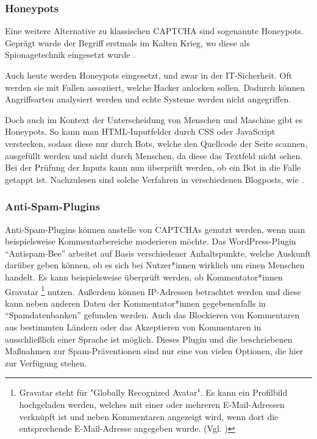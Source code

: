 \subsubsection*{Honeypots}
Eine weitere Alternative zu klassischen CAPTCHA sind sogenannte Honeypots. 
Geprägt wurde der Begriff erstmals im Kalten Krieg, wo diese als Spionagetechnik eingesetzt wurde \cite[p.2]{joshi:2011}.  

Auch heute werden Honeypots eingesetzt, und zwar in der IT-Sicherheit. 
Oft werden sie mit Fallen assoziiert, welche Hacker anlocken sollen. 
Dadurch können Angriffsarten analysiert werden und echte Systeme werden nicht angegriffen.

Doch auch im Kontext der Unterscheidung von Menschen und Maschine gibt es Honeypots. 
So kann man HTML-Inputfelder durch CSS oder JavaScript verstecken, sodass diese nur durch Bots, welche den Quellcode der Seite scannen, ausgefüllt werden 
und nicht durch Menschen, da diese das Textfeld nicht sehen. 
Bei der Prüfung der Inputs kann nun überprüft werden, ob ein Bot in die Falle getappt ist. 
Nachzulesen sind solche Verfahren in verschiedenen Blogposts, wie \cite{perry:2019}.

\subsubsection*{Anti-Spam-Plugins}
Anti-Spam-Plugins können anstelle von CAPTCHAs genutzt werden, wenn man beispielsweise Kommentar\-bereiche moderieren möchte.
Das WordPress-Plugin ``Antispam-Bee'' arbeitet auf Basis verschiedener Anhaltspunkte, 
welche Auskunft darüber geben können, ob es sich bei Nutzer*innen wirklich um einen Menschen handelt.
Es kann beispielsweise überprüft werden, ob Kommentator*innen Gravatar
\footnote[3]{Gravatar steht für "Globally Recognized Avatar". 
Es kann ein Profilbild hochgeladen werden, welches mit einer oder mehreren E-Mail-Adressen verknüpft ist 
und neben Kommentaren angezeigt wird, wenn dort die entsprechende E-Mail-Adresse angegeben wurde. (Vgl. \cite{doku:antispambee})} nutzen.
Außerdem können IP-Adressen betrachtet werden und diese kann neben anderen Daten der Kommentator*innen gegebenenfalls in ``Spamdatenbanken'' gefunden werden.
Auch das Blockieren von Kommentaren aus bestimmten Ländern oder das Akzeptieren von Kommentaren in ausschließlich einer Sprache ist möglich.
Dieses Plugin und die beschriebenen Maßnahmen zur Spam-Präventionen sind nur eine von vielen Optionen, die hier zur Verfügung stehen.
\cite{blog:antispambee}
\cite{doku:antispambee}

